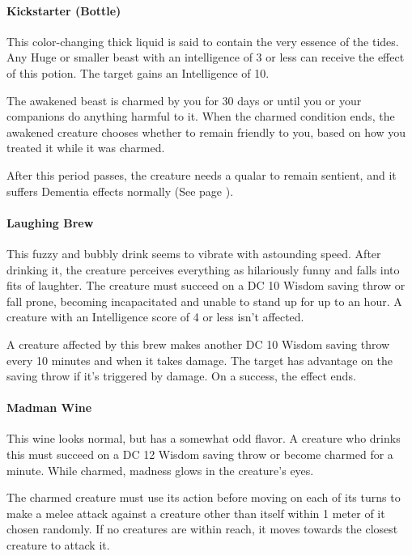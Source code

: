     \paragraph{Kickstarter (Bottle)} %
        This color-changing thick liquid is said to contain the very essence of the tides.
        Any Huge or smaller beast with an intelligence of 3 or less can receive the effect of this potion.
        The target gains an Intelligence of 10.

        The awakened beast is charmed by you for 30 days or until you or your companions do anything harmful to it.
        When the charmed condition ends, the awakened creature chooses whether to remain friendly to you, based on how you treated it while it was charmed.

        After this period passes, the creature needs a qualar to remain sentient, and it suffers Dementia effects normally (See page \pageref{ssec::dementia}).
    \paragraph{Laughing Brew} %
        This fuzzy and bubbly drink seems to vibrate with astounding speed.
        After drinking it, the creature perceives everything as hilariously funny and falls into fits of laughter.
        The creature must succeed on a DC 10 Wisdom saving throw or fall prone, becoming incapacitated and unable to stand up for up to an hour.
        A creature with an Intelligence score of 4 or less isn't affected.

        A creature affected by this brew makes another DC 10 Wisdom saving throw every 10 minutes and when it takes damage.
        The target has advantage on the saving throw if it's triggered by damage.
        On a success, the effect ends.
    \paragraph{Madman Wine} %
        This wine looks normal, but has a somewhat odd flavor.
        A creature who drinks this must succeed on a DC 12 Wisdom saving throw or become charmed for a minute.
        While charmed, madness glows in the creature's eyes.

        The charmed creature must use its action before moving on each of its turns to make a melee attack against a creature other than itself within 1 meter of it chosen randomly.
        If no creatures are within reach, it moves towards the closest creature to attack it.

